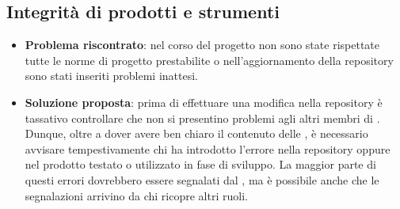 		\subsection{Integrità di prodotti e strumenti}
			\begin{itemize}
				\item \textbf{Problema riscontrato}: nel corso del progetto non sono state rispettate tutte le norme di progetto prestabilite o nell'aggiornamento della repository sono stati inseriti problemi inattesi.
				\item \textbf{Soluzione proposta}: prima di effettuare una modifica nella repository è tassativo controllare che non si presentino problemi agli altri membri di \gruppo. Dunque, oltre a dover avere ben chiaro il contenuto delle \NdP, è necessario avvisare tempestivamente chi ha introdotto l'errore nella repository oppure nel prodotto testato o utilizzato in fase di sviluppo. La maggior parte di questi errori dovrebbero essere segnalati dal \Ver, ma è possibile anche che le segnalazioni arrivino da chi ricopre altri ruoli.
			\end{itemize}
		
		
		
